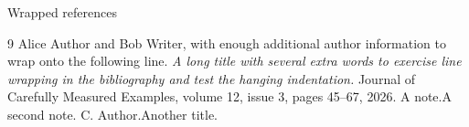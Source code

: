 \documentclass{beamer}
\begin{document}
\begin{frame}[t]{Wrapped references}
\footnotesize
\begin{thebibliography}{9}
 Alice Author and Bob Writer, with enough additional author information to wrap onto the following line.
\newblock \emph{A long title with several extra words to exercise line wrapping in the bibliography and test the hanging indentation.}
\newblock Journal of Carefully Measured Examples, volume 12, issue 3, pages 45--67, 2026.
\newblock A note.\newblock A second note.
 C. Author.\newblock Another title.
\end{thebibliography}
\end{frame}
\end{document}
